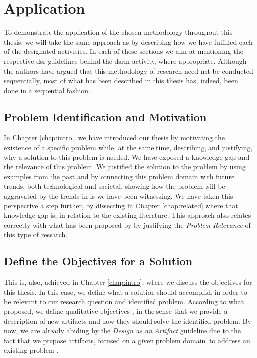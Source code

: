 \section{Application}

To demonstrate the application of the chosen methodology throughout this thesis, we will take the same approach as \cite{peffers_design_2007} by describing how we have fulfilled each of the designated activities. In each of these sections we aim at mentioning the respective \gls{dsr} guidelines behind the \gls{dsrm} activity, where appropriate. Although the authors have argued that this methodology of research need not be conducted sequentially, most of what has been described in this thesis has, indeed, been done in a sequential fashion.

\subsection{Problem Identification and Motivation}

In Chapter \ref{chap:intro}, we have introduced our thesis by motivating the existence of a specific problem while, at the same time, describing, and justifying, why a solution to this problem is needed. We have exposed a knowledge gap and the relevance of this problem. We justified the solution to the problem by using examples from the past and by connecting this problem domain with future trends, both technological and societal, showing how the problem will be aggravated by the trends in \gls{is} we have been witnessing. We have taken this perspective a step further, by dissecting in Chapter \ref{chap:related} where that knowledge gap is, in relation to the existing literature. This approach also relates correctly with what has been proposed by \citeauthor{hevner_design_2004} by justifying the \textit{Problem Relevance} of this type of research.

\subsection{Define the Objectives for a Solution}

This is, also, achieved in Chapter \ref{chap:intro}, where we discuss the objectives for this thesis. In this case, we define what a solution should accomplish in order to be relevant to our research question and identified problem. According to what \citeauthor{peffers_design_2007} proposed, we define qualitative objectives \cite[13]{peffers_design_2007}, in the sense that we provide a description of new artifacts and how they should solve the identified problem. By now, we are already abiding by the \textit{Design as an Artifact} guideline \cite{hevner_design_2004} due to the fact that we propose artifacts, focused on a given problem domain, to address an existing problem \cite[82]{hevner_design_2004}.

